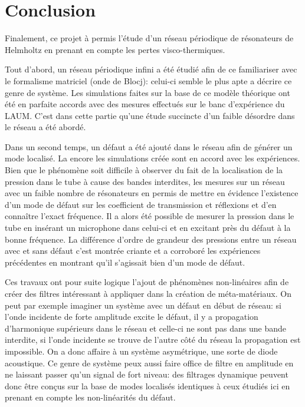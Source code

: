 \chapter{Conclusion}

Finalement, ce projet à permis l'étude d'un réseau périodique de résonateurs de Helmholtz en prenant en compte les pertes visco-thermiques. 

Tout d'abord, un réseau périodique infini a été étudié afin de ce familiariser avec le formalisme matriciel (onde de Blocj): celui-ci semble le plus apte a décrire ce genre de système. Les simulations faites sur la base de ce modèle théorique ont été en parfaite accords avec des mesures effectués sur le banc d'expérience du LAUM. C'est dans cette partie qu'une étude succincte d'un faible désordre dans le réseau a été abordé.

Dans un second temps, un  défaut a été ajouté dans le réseau afin de générer un mode localisé. La encore les simulations créée sont en accord avec les expériences. Bien que le phénomène soit difficile à observer du fait de la localisation de la pression dans le tube à cause des bandes interdites, les mesures sur un réseau avec un faible nombre de résonateurs en permis de mettre en évidence l’existence d'un mode de défaut sur les coefficient de transmission et réflexions et d'en connaître l'exact fréquence. Il a alors été possible de mesurer la pression dans le tube en insérant un microphone dans celui-ci et en excitant près du défaut à la bonne fréquence. La différence d'ordre de grandeur des pressions entre un réseau avec et sans défaut c'est montrée criante et a corroboré les expériences précédentes en montrant qu'il s'agissait bien d'un mode de défaut.

Ces travaux ont pour suite logique l'ajout de phénomènes non-linéaires afin de créer des filtres intéressant à appliquer dans la création de méta-matériaux. On peut par exemple imaginer un système avec un défaut en début de réseau: si l'onde incidente de forte amplitude excite le défaut, il y a propagation d'harmonique supérieurs dans le réseau et celle-ci ne sont pas dans une bande interdite, si l'onde incidente se trouve de l'autre côté du réseau la propagation est impossible. On a donc affaire à un système asymétrique, une sorte de diode acoustique. Ce genre de système peux aussi faire office de filtre en amplitude en ne laissant passer qu'un signal de fort niveau: des filtrages dynamique peuvent donc être conçus sur la base de modes localisés identiques à ceux étudiés ici en prenant en compte les non-linéarités du défaut.



